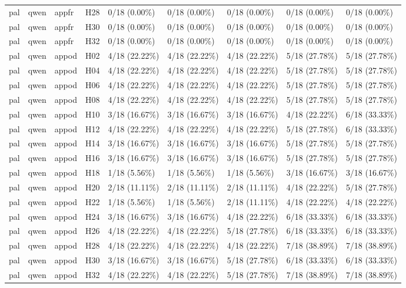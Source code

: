 \begin{longtable}{lllllllll}
pal & qwen & appfr & H28 & 0/18 (0.00\%) & 0/18 (0.00\%) & 0/18 (0.00\%) & 0/18 (0.00\%) & 0/18 (0.00\%) \\
pal & qwen & appfr & H30 & 0/18 (0.00\%) & 0/18 (0.00\%) & 0/18 (0.00\%) & 0/18 (0.00\%) & 0/18 (0.00\%) \\
pal & qwen & appfr & H32 & 0/18 (0.00\%) & 0/18 (0.00\%) & 0/18 (0.00\%) & 0/18 (0.00\%) & 0/18 (0.00\%) \\
pal & qwen & appod & H02 & 4/18 (22.22\%) & 4/18 (22.22\%) & 4/18 (22.22\%) & 5/18 (27.78\%) & 5/18 (27.78\%) \\
pal & qwen & appod & H04 & 4/18 (22.22\%) & 4/18 (22.22\%) & 4/18 (22.22\%) & 5/18 (27.78\%) & 5/18 (27.78\%) \\
pal & qwen & appod & H06 & 4/18 (22.22\%) & 4/18 (22.22\%) & 4/18 (22.22\%) & 5/18 (27.78\%) & 5/18 (27.78\%) \\
pal & qwen & appod & H08 & 4/18 (22.22\%) & 4/18 (22.22\%) & 4/18 (22.22\%) & 5/18 (27.78\%) & 5/18 (27.78\%) \\
pal & qwen & appod & H10 & 3/18 (16.67\%) & 3/18 (16.67\%) & 3/18 (16.67\%) & 4/18 (22.22\%) & 6/18 (33.33\%) \\
pal & qwen & appod & H12 & 4/18 (22.22\%) & 4/18 (22.22\%) & 4/18 (22.22\%) & 5/18 (27.78\%) & 6/18 (33.33\%) \\
pal & qwen & appod & H14 & 3/18 (16.67\%) & 3/18 (16.67\%) & 3/18 (16.67\%) & 5/18 (27.78\%) & 5/18 (27.78\%) \\
pal & qwen & appod & H16 & 3/18 (16.67\%) & 3/18 (16.67\%) & 3/18 (16.67\%) & 5/18 (27.78\%) & 5/18 (27.78\%) \\
pal & qwen & appod & H18 & 1/18 (5.56\%) & 1/18 (5.56\%) & 1/18 (5.56\%) & 3/18 (16.67\%) & 3/18 (16.67\%) \\
pal & qwen & appod & H20 & 2/18 (11.11\%) & 2/18 (11.11\%) & 2/18 (11.11\%) & 4/18 (22.22\%) & 5/18 (27.78\%) \\
pal & qwen & appod & H22 & 1/18 (5.56\%) & 1/18 (5.56\%) & 2/18 (11.11\%) & 4/18 (22.22\%) & 4/18 (22.22\%) \\
pal & qwen & appod & H24 & 3/18 (16.67\%) & 3/18 (16.67\%) & 4/18 (22.22\%) & 6/18 (33.33\%) & 6/18 (33.33\%) \\
pal & qwen & appod & H26 & 4/18 (22.22\%) & 4/18 (22.22\%) & 5/18 (27.78\%) & 6/18 (33.33\%) & 6/18 (33.33\%) \\
pal & qwen & appod & H28 & 4/18 (22.22\%) & 4/18 (22.22\%) & 4/18 (22.22\%) & 7/18 (38.89\%) & 7/18 (38.89\%) \\
pal & qwen & appod & H30 & 3/18 (16.67\%) & 3/18 (16.67\%) & 5/18 (27.78\%) & 6/18 (33.33\%) & 6/18 (33.33\%) \\
pal & qwen & appod & H32 & 4/18 (22.22\%) & 4/18 (22.22\%) & 5/18 (27.78\%) & 7/18 (38.89\%) & 7/18 (38.89\%) \\
\end{longtable}
